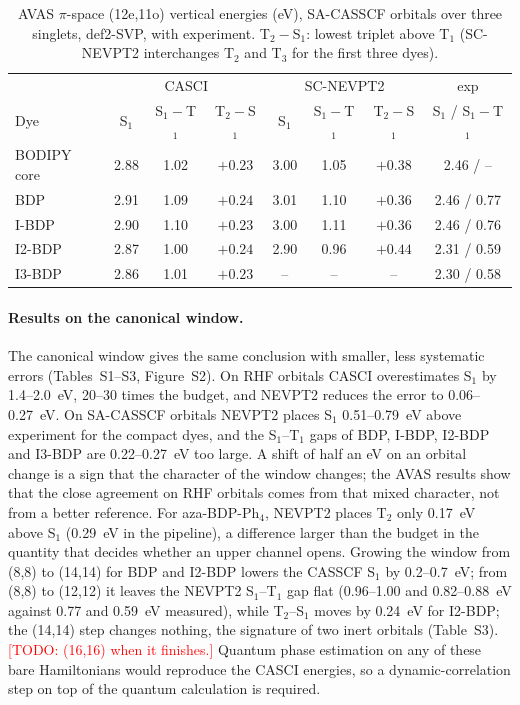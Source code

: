 \documentclass[journal=jctcce,manuscript=article,layout=twocolumn]{achemso}
\newcommand{\todo}[1]{\textcolor{red}{[TODO: #1]}}
\begin{document}
\begin{table}
  \caption{AVAS $\pi$-space (12e,11o) vertical energies (eV), SA-CASSCF orbitals over three singlets,
  def2-SVP, with experiment. T$_2-$S$_1$: lowest triplet above T$_1$ (SC-NEVPT2 interchanges T$_2$ and T$_3$
  for the first three dyes).}
  \label{tab:pi}
  \begin{tabular}{lccccccc}
    \toprule
    & \multicolumn{3}{c}{CASCI} & \multicolumn{3}{c}{SC-NEVPT2} & exp \\
    Dye & S$_1$ & S$_1-$T$_1$ & T$_2-$S$_1$ & S$_1$ & S$_1-$T$_1$ & T$_2-$S$_1$ & S$_1$ / S$_1-$T$_1$ \\
    \midrule
    BODIPY core & 2.88 & 1.02 & $+0.23$ & 3.00 & 1.05 & $+0.38$ & 2.46 / -- \\
    BDP         & 2.91 & 1.09 & $+0.24$ & 3.01 & 1.10 & $+0.36$ & 2.46 / 0.77 \\
    I-BDP       & 2.90 & 1.10 & $+0.23$ & 3.00 & 1.11 & $+0.36$ & 2.46 / 0.76 \\
    I2-BDP      & 2.87 & 1.00 & $+0.24$ & 2.90 & 0.96 & $+0.44$ & 2.31 / 0.59 \\
    I3-BDP      & 2.86 & 1.01 & $+0.23$ & --   & --   & --      & 2.30 / 0.58 \\
    \bottomrule
  \end{tabular}
\end{table}

\paragraph{Results on the canonical window.} The canonical window gives the same conclusion with
smaller, less systematic errors (Tables~S1--S3, Figure~S2). On RHF orbitals CASCI overestimates S$_1$ by
1.4--2.0~eV, 20--30 times the budget, and NEVPT2 reduces the error to 0.06--0.27~eV. On SA-CASSCF
orbitals NEVPT2 places S$_1$ 0.51--0.79~eV above experiment for the compact dyes, and the S$_1$--T$_1$
gaps of BDP, I-BDP, I2-BDP and I3-BDP are 0.22--0.27~eV too large. A shift of half an eV on an orbital
change is a sign that the character of the window changes; the AVAS results show that the close
agreement on RHF orbitals comes from that mixed character, not from a better reference. For
aza-BDP-Ph$_4$, NEVPT2 places T$_2$ only 0.17~eV above S$_1$ (0.29~eV in the pipeline), a difference larger
than the budget in the quantity that decides whether an upper channel opens. Growing the window from
(8,8) to (14,14) for BDP and I2-BDP lowers the CASSCF S$_1$ by 0.2--0.7~eV; from (8,8) to (12,12) it leaves
the NEVPT2 S$_1$--T$_1$ gap flat (0.96--1.00 and 0.82--0.88~eV against 0.77 and 0.59~eV measured), while T$_2$--S$_1$
moves by 0.24~eV for I2-BDP; the (14,14) step changes nothing, the signature of two inert orbitals
(Table~S3). \todo{(16,16) when it finishes.} Quantum phase estimation on any of these bare Hamiltonians
would reproduce the CASCI energies, so a dynamic-correlation step on top of the quantum calculation is
required.
\end{document}
